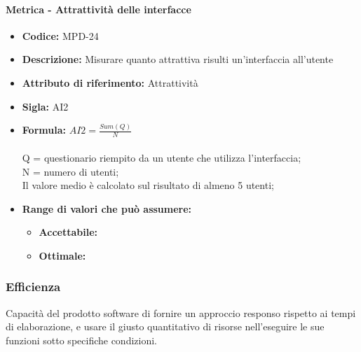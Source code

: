                   \paragraph{Metrica - Attrattività delle interfacce} 
            \begin{itemize}
           \item   \textbf{Codice:} MPD-24
           \item   \textbf{Descrizione:} Misurare quanto attrattiva risulti un'interfaccia all'utente                  
            \item \textbf{Attributo di riferimento:} Attrattività
            \item  \textbf{Sigla:} AI2
           \item   \textbf{Formula:} \begin{math}AI2 = \frac{Sum(Q)}{N}\end{math}\\ \\
            Q = questionario riempito da un utente che utilizza l'interfaccia;\\
            N = numero di utenti;\\
            Il valore medio è calcolato sul risultato di almeno 5 utenti;
            \item \textbf{Range di valori che può assumere:}
        \begin{itemize}
            \item \textbf{Accettabile:} 
            \item \textbf{Ottimale:} 
        \end{itemize}
       \end{itemize}
       
                     \subsubsection{Efficienza}
   Capacità del prodotto software di fornire un approccio responso rispetto ai tempi di elaborazione, e usare il giusto quantitativo di risorse nell'eseguire le sue funzioni sotto specifiche condizioni. 
   
